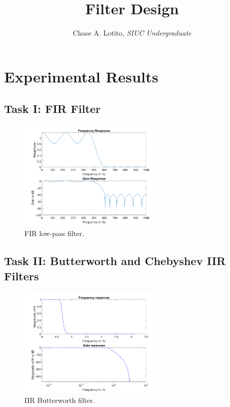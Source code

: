 \documentclass{IEEEtran}
\title{\vspace{-3cm} Filter Design}
\author{Chase A. Lotito, \textit{SIUC Undergraduate}}
\date{}
\begin{document}
\pagestyle{fancy}

\fancyhead{}

\maketitle %

\section{Experimental Results}

\subsection{Task I: FIR Filter}

\begin{figure}[!ht] 
    \centering
    \includegraphics[width = 7cm]{task1.png}
    \caption{FIR low-pass filter.}
    \label{fig:task1}
\end{figure}

\subsection{Task II: Butterworth and Chebyshev IIR Filters}

\begin{figure}[!ht] 
    \centering
    \includegraphics[width = 7cm]{butterworth.png}
    \caption{IIR Butterworth filter.}
    \label{fig:butterworth}
\end{figure}
\end{document}
